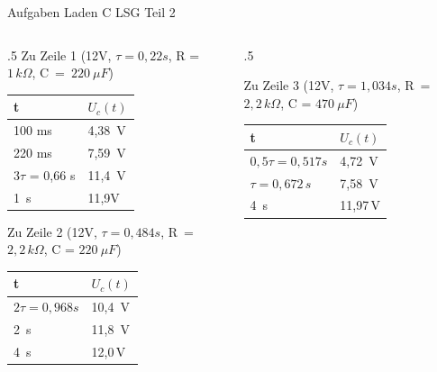 \begin{frame}{Aufgaben Laden C LSG Teil 2}
  \begin{columns}[t]
    \begin{column}{.5\textwidth}
    Zu Zeile 1 (12V, $\tau = 0,22 s$, R = $1\, k\Omega$, C~=~$220\ \mu F$)

\begin{tabular}{|l|l|}
  \hline
 t & $U_c(t)$ \\ \hline
 100 ms & 4,38\, V \\ \hline
 220 ms & 7,59\, V \\ \hline
 $3\tau$ = 0,66 s & 11,4\, V\\ \hline
 1\, s & 11,9V\\ \hline
\end{tabular}

Zu Zeile 2 (12V, $\tau = 0,484 s$, R~=~$2,2\, k\Omega$, C = $220\ \mu F$)

\begin{tabular}{|l|l|}
  \hline
 t & $U_c(t)$ \\ \hline
 $2\tau = 0,968 s$ & 10,4\, V \\ \hline
 2\, s & 11,8\, V \\ \hline
 4\, s & 12,0\,V\\ \hline
\end{tabular}
    \end{column}
    \begin{column}{.5\textwidth}

    Zu Zeile 3 (12V, $\tau = 1,034 s$, R~=~$2,2\, k\Omega$, C = $470\ \mu F$)

\begin{tabular}{|l|l|}
  \hline
 t & $U_c(t)$ \\ \hline
 $0,5\tau = 0,517 s$ & 4,72\, V \\ \hline
 $\tau = 0,672\, s$ & 7,58\, V \\ \hline
 4\, s & 11,97\,V\\ \hline
\end{tabular}
    \end{column}
  \end{columns}
\end{frame}




%

